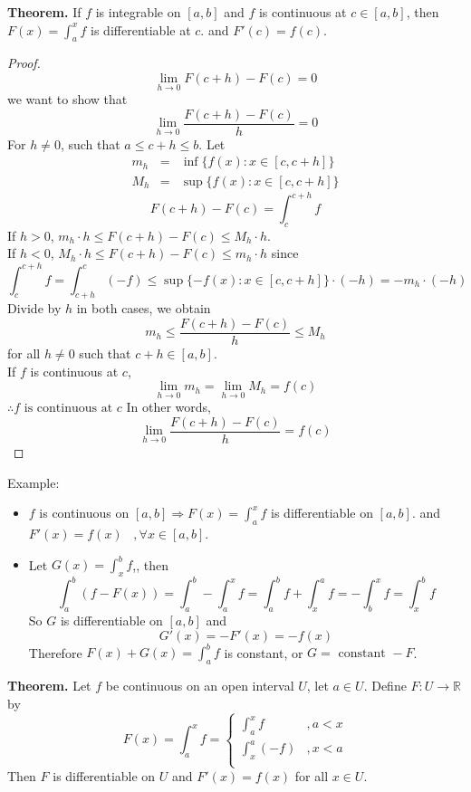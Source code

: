 \documentclass[10pt,letterpaper]{article}
\begin{document}
	\textbf{Theorem. } If $f$ is integrable on $[a, b]$ and $f$ is continuous at $c \in [a, b]$,
	then $F(x) = \displaystyle\int_{a}^{x} f $ is differentiable at $c$. and
	$F'(c) = f(c)$.
	\begin{proof}
		$$\displaystyle\lim_{h\to 0} F(c + h) - F(c) = 0$$
		we want to show that
		$$\displaystyle\lim_{h\to 0} \dfrac{F(c + h) - F(c)}{h} = 0$$
		For $h \neq 0$, such that $a \leq c + h \leq b$. Let
\begin{eqnarray*}
	m_h &=& \inf\{f(x) : x \in [c, c + h]\} \\
	M_h &=& \sup\{f(x) : x \in [c, c + h]\} 
\end{eqnarray*}
	$$F(c + h) - F(c) = \displaystyle\int_{c}^{c + h}f$$
	If $h > 0$, $m_h \cdot h \leq F(c + h) - F(c) \leq M_h \cdot h$. \\
	If $h < 0$, $M_h \cdot h \leq F(c + h) - F(c) \leq m_h \cdot h$ since
	$$\displaystyle\int_{c}^{c+h} f = \displaystyle\int_{c+h}^{c} (-f) 
	\leq \sup\{-f(x) : x \in [c, c + h]\} \cdot (-h) = -m_h \cdot (-h)$$
	Divide by $h$ in both cases, we obtain
	$$m_h \leq \dfrac{F(c + h) - F(c)}{h} \leq M_h$$
	for all $h \neq 0$ such that $c + h \in [a, b]$. \\
	If $f$ is continuous at $c$, 
	$$\displaystyle\lim_{h\to 0}m_h = \displaystyle\lim_{h\to 0}M_h = f(c)$$
	$\therefore f \text{ is continuous at } c$
	In other words,
	$$\displaystyle\lim_{h\to 0} \dfrac{F(c + h) - F(c)}{h} = f(c)$$
	\end{proof}

	Example:
	\begin{itemize}
	\item $f$ is continuous on $[a, b] \Rightarrow F(x) = \displaystyle\int_{a}^{x} f$
	is differentiable on $[a, b]$. and
	$F'(x) = f(x) \, \, \, \, \, , \forall x \in [a, b]$.
	\item Let $G(x) = \displaystyle\int_{x}^{b} f$,, then
	$$\displaystyle\int_{a}^{b}(f - F(x)) = \displaystyle\int_{a}^{b} - \displaystyle\int_{a}^{x} f
	= \displaystyle\int_{a}^{b} f + \displaystyle\int_{x}^{a} f 
	= -\displaystyle\int_{b}^{x} f = \displaystyle\int_{x}^{b} f $$
	So $G$ is differentiable on $[a, b]$ and 
	$$G'(x) = - F'(x) = -f(x)$$
	Therefore
	$F(x) + G(x) = \displaystyle\int_{a}^{b} f$ is constant, or 
	$G = \text{ constant } - F$.
	\end{itemize}
	
	\textbf{Theorem. } Let $f$ be continuous on an open interval
	$U$, let $a \in U$. Define $F: U \rightarrow \mathbb{R}$ by
	$$
	F(x) = \displaystyle\int_{a}^{x} f =
	\begin{cases}
		\int_{a}^{x} f  &, a < x \\
		\int_{x}^{a} (-f) &, x < a \\
	\end{cases}
	$$	
	Then $F$ is differentiable on $U$ and $F'(x) = f(x)$ for all $x \in U$. \\
	
\end{document}
